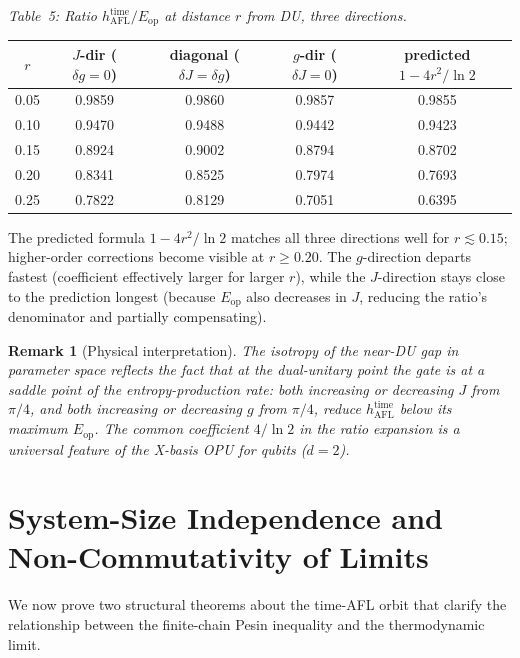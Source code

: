 \documentclass[12pt,a4paper]{article}
\newtheorem{remark}[theorem]{Remark}
\begin{document}
\medskip
\noindent\textit{Table~5: Ratio $h_\mathrm{AFL}^\mathrm{time}/E_\mathrm{op}$ at distance $r$ from DU, three directions.}

\begin{center}
\begin{tabular}{@{}ccccc@{}}
\toprule
$r$ & $J$-dir ($\delta g=0$) & diagonal ($\delta J=\delta g$) & $g$-dir ($\delta J=0$) & predicted $1-4r^2/\ln2$\\
\midrule
0.05 & 0.9859 & 0.9860 & 0.9857 & 0.9855 \\
0.10 & 0.9470 & 0.9488 & 0.9442 & 0.9423 \\
0.15 & 0.8924 & 0.9002 & 0.8794 & 0.8702 \\
0.20 & 0.8341 & 0.8525 & 0.7974 & 0.7693 \\
0.25 & 0.7822 & 0.8129 & 0.7051 & 0.6395 \\
\bottomrule
\end{tabular}
\end{center}

\noindent The predicted formula $1-4r^2/\ln 2$ matches all three directions
well for $r\lesssim 0.15$; higher-order corrections become visible at $r\ge 0.20$.
The $g$-direction departs fastest (coefficient effectively larger for larger $r$),
while the $J$-direction stays close to the prediction longest (because $E_\mathrm{op}$
also decreases in $J$, reducing the ratio's denominator and partially compensating).

\begin{remark}[Physical interpretation]
The isotropy of the near-DU gap in parameter space reflects the fact that at the
dual-unitary point the gate is at a \emph{saddle point} of the entropy-production
rate: both increasing or decreasing $J$ from $\pi/4$, and both increasing or
decreasing $g$ from $\pi/4$, reduce $h_\mathrm{AFL}^\mathrm{time}$ below its
maximum $E_\mathrm{op}$.  The common coefficient $4/\ln 2$ in the ratio expansion
is a universal feature of the X-basis OPU for qubits ($d=2$).
\end{remark}


\section{System-Size Independence and Non-Commutativity of Limits}
\label{sec:L_independence}

We now prove two structural theorems about the time-AFL orbit that clarify the
relationship between the finite-chain Pesin inequality and the thermodynamic limit.
\end{document}
